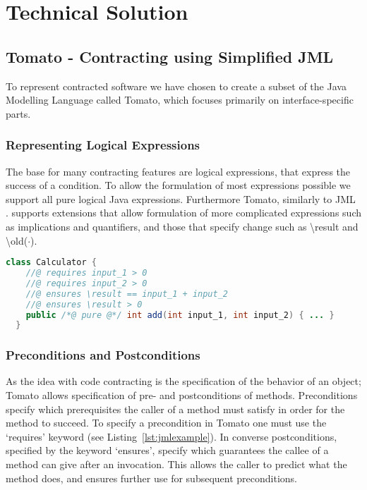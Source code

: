 \section{Technical Solution}
\subsection{Tomato - Contracting using Simplified JML}
\label{sub:Tomato - Contracting using Simplified JML}

To represent contracted software we have chosen to create a subset of the
Java Modelling Language called Tomato,
which focuses primarily on interface-specific parts.

\subsubsection{Representing Logical Expressions}
\label{sub:Representing Logical Expressions}
The base for many contracting features are logical expressions, that express
the success of a condition.
To allow the formulation of most expressions possible we support all pure
logical Java expressions.
Furthermore Tomato, similarly to JML \cite{leavens2006design}.
supports extensions that allow formulation of more complicated
expressions such as implications and quantifiers,
and those that specify change such as \textbackslash result
and \textbackslash old($\cdot$).

\begin{lstlisting}[language=Java,caption={Contracted Method for Adding Natural Numbers},label={lst:jmlexample}]
  class Calculator {
    //@ requires input_1 > 0
    //@ requires input_2 > 0
    //@ ensures \result == input_1 + input_2
    //@ ensures \result > 0
    public /*@ pure @*/ int add(int input_1, int input_2) { ... }
  }
\end{lstlisting}

\subsubsection{Preconditions and Postconditions}
\label{sub:Preconditions and Postconditions}

As the idea with code contracting is the specification of the behavior of
an object; Tomato allows specification of pre- and postconditions of methods.
Preconditions specify which prerequisites the caller of a method must
satisfy in order for the method to succeed.
To specify a precondition in Tomato one must use the ‘requires’
keyword (see Listing~\ref{lst:jmlexample}).
In converse postconditions, specified by the keyword ‘ensures’,
specify which guarantees the callee of a method can give after an invocation.
This allows the caller to predict what the method does,
and ensures further use for subsequent preconditions.

